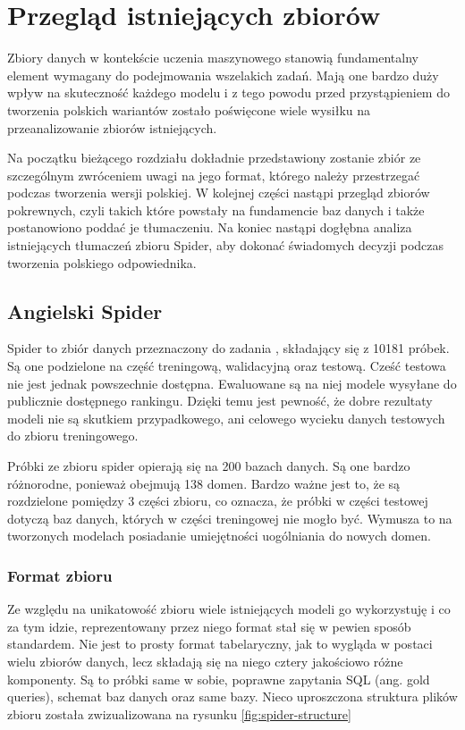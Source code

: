 \chapter{Przegląd istniejących zbiorów}
Zbiory danych w kontekście uczenia maszynowego stanowią fundamentalny element wymagany do podejmowania wszelakich zadań. Mają one bardzo duży wpływ na skuteczność każdego modelu i z tego powodu przed przystąpieniem do tworzenia polskich wariantów zostało poświęcone wiele wysiłku na przeanalizowanie zbiorów istniejących.

Na początku bieżącego rozdziału dokładnie przedstawiony zostanie zbiór  ze szczególnym zwróceniem uwagi na jego format, którego należy przestrzegać podczas tworzenia wersji polskiej. W kolejnej części nastąpi przegląd zbiorów pokrewnych, czyli takich które powstały na fundamencie baz danych  i także postanowiono poddać je tłumaczeniu. Na koniec nastąpi dogłębna analiza istniejących tłumaczeń zbioru Spider, aby dokonać świadomych decyzji podczas tworzenia polskiego odpowiednika.

\section{Angielski Spider}
Spider to zbiór danych przeznaczony do zadania , składający się z 10181 próbek. Są one podzielone na część treningową, walidacyjną oraz testową. Cześć testowa nie jest jednak powszechnie dostępna. Ewaluowane są na niej modele wysyłane do publicznie dostępnego rankingu. Dzięki temu jest pewność, że dobre rezultaty modeli nie są skutkiem przypadkowego, ani celowego wycieku danych testowych do zbioru treningowego.

Próbki ze zbioru spider opierają się na 200 bazach danych. Są one bardzo różnorodne, ponieważ obejmują 138 domen. Bardzo ważne jest to, że są rozdzielone pomiędzy 3 części zbioru, co oznacza, że próbki w części testowej dotyczą baz danych, których w części treningowej nie mogło być. Wymusza to na tworzonych modelach posiadanie umiejętności uogólniania do nowych domen.

\subsection{Format zbioru}

Ze względu na unikatowość zbioru  wiele istniejących modeli go wykorzystuję i co za tym idzie, reprezentowany przez niego format stał się w pewien sposób standardem. Nie jest to prosty format tabelaryczny, jak to wygląda w postaci wielu zbiorów danych, lecz składają się na niego cztery jakościowo różne komponenty. Są to próbki same w sobie, poprawne zapytania SQL (ang. gold queries), schemat baz danych oraz same bazy. Nieco uproszczona struktura plików zbioru została zwizualizowana na rysunku \ref{fig:spider-structure} 

